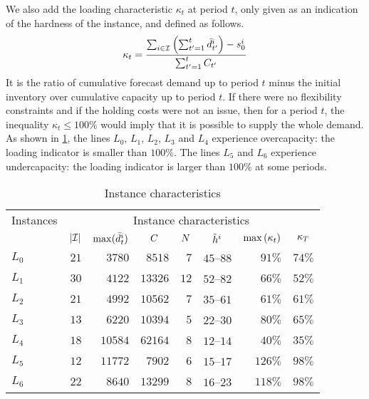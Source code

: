 We also add the loading characteristic $\kappa_t$ at period $t$, only given as an indication of the hardness of the instance, and defined as follows.
\begin{equation}
  \kappa_t = \frac{\sum_{i\in\REF} \bracket{\sum_{t'=1}^{t} \bar{\demand}_{t'}^i}-\inventory_0^i}{ \sum_{t'=1}^{t} \capacity_{t'}}
\end{equation}
It is the ratio of cumulative forecast demand up to period $t$ minus the initial inventory over cumulative capacity up to period $t$.
If there were no flexibility constraints and if the holding costs were not an issue, then for a period $t$, the inequality $\kappa_t \le 100\%$ would imply that it is possible to supply the whole demand.
As shown in \cref{tab:pdp:instances-characterisitcs}, the lines $L_0$, $L_1$, $L_2$, $L_3$ and $L_4$ experience overcapacity: the loading indicator is smaller than $100\%$.
The lines $L_5$ and $L_6$ experience undercapacity: the loading indicator is larger than $100\%$ at some periods.


\begin{table}[ht]
\begin{center}
\begin{tabular*}{\linewidth}{@{\extracolsep{\fill}}lrrrrrrr@{\extracolsep{\fill}}}
\hline
Instances &
\multicolumn{7}{c}{Instance characteristics}
\\ \cline{2-8} \rule{0pt}{.9\normalbaselineskip}
& $\card{\REF}$
& $\max(\bar{d}_t^i)$
& \multicolumn{1}{c}{$C$}
& \multicolumn{1}{c}{$N$}
& \multicolumn{1}{c}{$\tilde{h}^i$}
& \multicolumn{1}{c}{$\max\bracket{\kappa_t}$}
& \multicolumn{1}{c}{$\kappa_{T}$}
\\\hline
$L_0$ & $21$ & $3780$ & $8518$ & $7$ & $45$--$88$ & $91\%$ & $74\%$
\\
$L_1$ & $30$ & $4122$ & $13326$ & $12$ & $52$--$82$ & $66\%$ & $52\%$
\\
$L_2$ & $21$ & $4992$ & $10562$ & $7$ & $35$--$61$ & $61\%$ & $61\%$
\\
$L_3$ & $13$ & $6220$ & $10394$ & $5$ & $22$--$30$ & $80\%$ & $65\%$
\\
$L_4$ & $18$ & $10584$ & $62164$ & $8$ & $12$--$14$ & $40\%$ & $35\%$
\\
$L_5$ & $12$ & $11772$ & $7902$ & $6$ & $15$--$17$ & $126\%$ & $98\%$
\\
$L_6$ & $22$ & $8640$ & $13299$ & $8$ & $16$--$23$ & $118\%$ & $98\%$
\\\hline
\end{tabular*}
\caption{Instance characteristics}
\label{tab:pdp:instances-characterisitcs}
\end{center}
\end{table}


